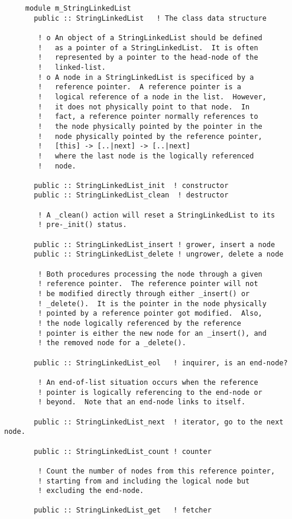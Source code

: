 \begin{verbatim} 
     module m_StringLinkedList
       public :: StringLinkedList	! The class data structure
 
 		! o An object of a StringLinkedList should be defined
 		!   as a pointer of a StringLinkedList.  It is often
 		!   represented by a pointer to the head-node of the
 		!   linked-list.
 		! o A node in a StringLinkedList is specificed by a
 		!   reference pointer.  A reference pointer is a
 		!   logical reference of a node in the list.  However,
 		!   it does not physically point to that node.  In
 		!   fact, a reference pointer normally references to
 		!   the node physically pointed by the pointer in the
 		!   node physically pointed by the reference pointer,
 		!	[this] -> [..|next] -> [..|next]
 		!   where the last node is the logically referenced
 		!   node.
 
       public :: StringLinkedList_init	! constructor
       public :: StringLinkedList_clean  ! destructor
 
 		! A _clean() action will reset a StringLinkedList to its
 		! pre-_init() status.
 
       public :: StringLinkedList_insert ! grower, insert a node
       public :: StringLinkedList_delete ! ungrower, delete a node
 
 		! Both procedures processing the node through a given
 		! reference pointer.  The reference pointer will not
 		! be modified directly through either _insert() or
 		! _delete().  It is the pointer in the node physically
 		! pointed by a reference pointer got modified.  Also,
 		! the node logically referenced by the reference
 		! pointer is either the new node for an _insert(), and
 		! the removed node for a _delete().
 
       public :: StringLinkedList_eol	! inquirer, is an end-node?
 
 		! An end-of-list situation occurs when the reference
 		! pointer is logically referencing to the end-node or
 		! beyond.  Note that an end-node links to itself.
 
       public :: StringLinkedList_next	! iterator, go to the next node.
 
       public :: StringLinkedList_count	! counter
       
 		! Count the number of nodes from this reference pointer,
 		! starting from and including the logical node but
 		! excluding the end-node.
 
       public :: StringLinkedList_get	! fetcher
 

\end{verbatim}

